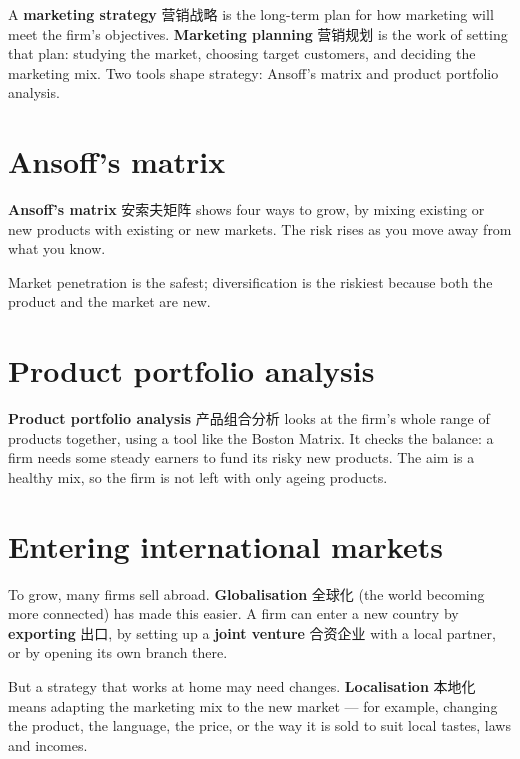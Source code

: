 \documentclass[11pt]{article}
\begin{document}
A \textbf{marketing strategy} 营销战略 is the long-term plan for how marketing will meet the firm's objectives. \textbf{Marketing planning} 营销规划 is the work of setting that plan: studying the market, choosing target customers, and deciding the marketing mix. Two tools shape strategy: Ansoff's matrix and product portfolio analysis.

\section*{Ansoff's matrix}

\textbf{Ansoff's matrix} 安索夫矩阵 shows four ways to grow, by mixing existing or new products with existing or new markets. The risk rises as you move away from what you know.

\begin{center}
\end{center}

Market penetration is the safest; diversification is the riskiest because both the product and the market are new.

\section*{Product portfolio analysis}

\textbf{Product portfolio analysis} 产品组合分析 looks at the firm's whole range of products together, using a tool like the Boston Matrix. It checks the balance: a firm needs some steady earners to fund its risky new products. The aim is a healthy mix, so the firm is not left with only ageing products.

\section*{Entering international markets}

To grow, many firms sell abroad. \textbf{Globalisation} 全球化 (the world becoming more connected) has made this easier. A firm can enter a new country by \textbf{exporting} 出口, by setting up a \textbf{joint venture} 合资企业 with a local partner, or by opening its own branch there.

But a strategy that works at home may need changes. \textbf{Localisation} 本地化 means adapting the marketing mix to the new market — for example, changing the product, the language, the price, or the way it is sold to suit local tastes, laws and incomes.
\end{document}
